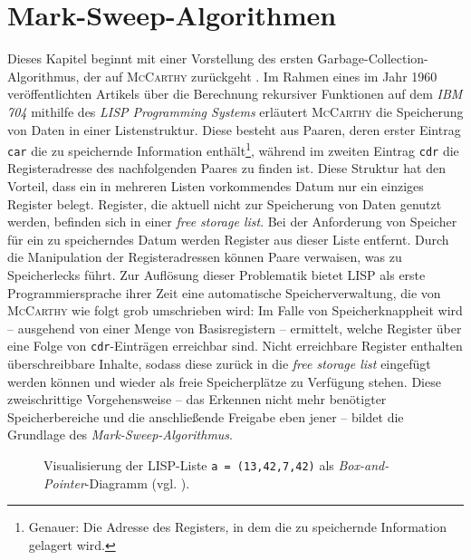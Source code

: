 \chapter{Mark-Sweep-Algorithmen}
\label{cha:mark-sweep}
Dieses Kapitel beginnt mit einer Vorstellung des ersten Garbage-Collection-Algorithmus, der auf \textsc{McCarthy} zurückgeht \cite[191--193]{mccarthy1960}.
Im Rahmen eines im Jahr 1960 veröffentlichten Artikels über die Berechnung rekursiver Funktionen auf dem \textit{IBM 704} mithilfe des \textit{LISP Programming Systems} erläutert \textsc{McCarthy} die Speicherung von Daten in einer Listenstruktur.
Diese besteht aus Paaren, deren erster Eintrag \texttt{car} die zu speichernde Information enthält\footnote{Genauer: Die Adresse des Registers, in dem die zu speichernde Information gelagert wird.}, während im zweiten Eintrag \texttt{cdr} die Registeradresse des nachfolgenden Paares zu finden ist.
Diese Struktur hat den Vorteil, dass ein in mehreren Listen vorkommendes Datum nur ein einziges Register belegt.
Register, die aktuell nicht zur Speicherung von Daten genutzt werden, befinden sich in einer \textit{free storage list}.
Bei der Anforderung von Speicher für ein zu speicherndes Datum werden Register aus dieser Liste entfernt.
Durch die Manipulation der Registeradressen können Paare verwaisen, was zu Speicherlecks führt.
Zur Auflösung dieser Problematik bietet LISP als erste Programmiersprache ihrer Zeit eine automatische Speicherverwaltung, die von \textsc{McCarthy} wie folgt grob umschrieben wird:
Im Falle von Speicherknappheit wird -- ausgehend von einer Menge von Basisregistern -- ermittelt, welche Register über eine Folge von \texttt{cdr}-Einträgen erreichbar sind.
Nicht erreichbare Register enthalten überschreibbare Inhalte, sodass diese zurück in die \textit{free storage list} eingefügt werden können und wieder als freie Speicherplätze zu Verfügung stehen.
Diese zweischrittige Vorgehensweise -- das Erkennen nicht mehr benötigter Speicherbereiche und die anschließende Freigabe eben jener -- bildet die Grundlage des \textit{Mark-Sweep-Algorithmus}.

\begin{figure}[h]
	\centering
	
	\caption[Visualisierung einer LISP-Liste]{Visualisierung der LISP-Liste \texttt{a = (13,42,7,42)} als \textit{Box-and-Pointer}-Diagramm (vgl. \cite[Kapitel 3.3]{sicp}).}
	\label{fig:lisp-list}
\end{figure}




